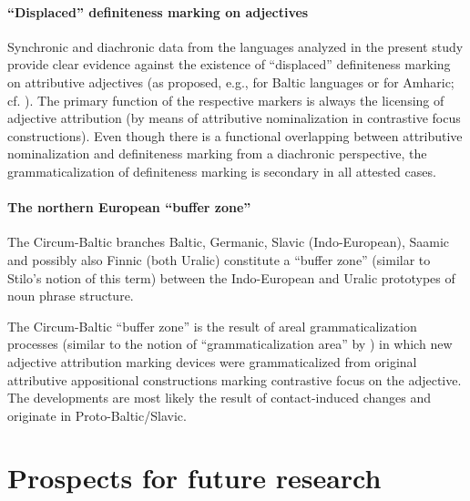 \paragraph{“Displaced” definiteness marking on adjectives}
Synchronic and diachronic data from the languages analyzed in the present study provide clear evidence against the existence of “displaced” definiteness marking on attributive adjectives (as proposed, e.g., for Baltic languages or for Amharic; cf. \citealt[122]{dahl2015a}). The primary function of the respective markers is always the licensing of adjective attribution (by means of attributive nominalization in contrastive focus constructions). Even though there is a functional overlapping between attributive nominalization and definiteness marking from a diachronic perspective, the grammaticalization of definiteness marking is secondary in all attested cases.

\paragraph{The northern European “buffer zone”}
The Circum-Baltic branches Baltic, Germanic, Slavic (Indo-European), Saamic and possibly also Finnic (both Uralic) constitute a “buffer zone” (similar to Stilo's \citeyear{stilo2005} notion of this term) between the Indo-European and Uralic prototypes of noun phrase structure.

The Circum-Baltic “buffer zone” is the result of areal grammaticalization processes (similar to the notion of “grammaticalization area” by \cite{heine-etal2005}) in which new adjective attribution marking devices were grammaticalized from original attributive appositional constructions marking contrastive focus on the adjective. The developments are most likely the result of contact-induced changes and originate in Proto\hyp{}Baltic\slash{}Slavic.

\section{Prospects for future research}
